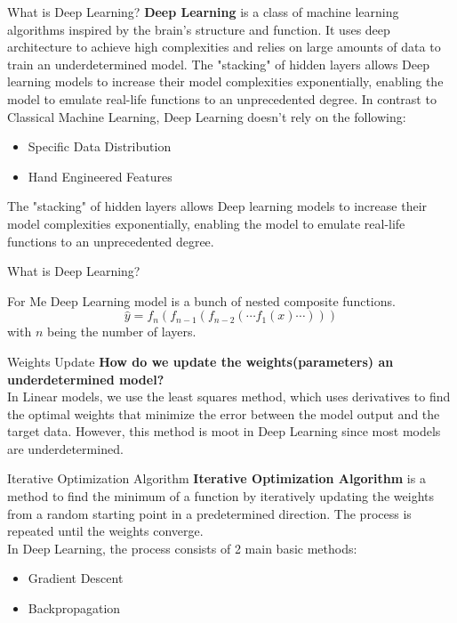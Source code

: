 \documentclass{beamer}
\begin{document}
\begin{frame}[fragile]{What is Deep Learning?}
    \textbf{Deep Learning} is a class of machine learning algorithms inspired by the brain's structure and function. It uses deep architecture to achieve high complexities and relies on large amounts of data to train an underdetermined model. The "stacking" of hidden layers allows Deep learning models to increase their model complexities exponentially, enabling the model to emulate real-life functions to an unprecedented degree. In contrast to Classical Machine Learning, Deep Learning doesn't rely on the following:
    \begin{itemize}
        \item Specific Data Distribution
        \item Hand Engineered Features
    \end{itemize}
    The "stacking" of hidden layers allows Deep learning models to increase their model complexities exponentially, enabling the model to emulate real-life functions to an unprecedented degree.
\end{frame}
\begin{frame}[fragile]{What is Deep Learning?}
    \begin{block}{For Me}
        Deep Learning model is a bunch of nested composite functions.\\
        \begin{equation*}
            \hat{y} = f_{n}(f_{n-1}(f_{n-2}(\cdots f_{1}(x)\cdots)))
        \end{equation*}
        with $n$ being the number of layers.
    \end{block}
\end{frame}
\begin{frame}[fragile]{Weights Update}
    \textbf{How do we update the weights(parameters) an underdetermined model?}\\
    In Linear models, we use the least squares method, which uses derivatives to find the optimal weights that minimize the error between the model output and the target data.
    However, this method is moot in Deep Learning since most models are underdetermined.
\end{frame}
\begin{frame}[fragile]{Iterative Optimization Algorithm}
    \textbf{Iterative Optimization Algorithm} is a method to find the minimum of a function by iteratively updating the weights from a random starting point in a predetermined direction. The process is repeated until the weights converge. \\
    In Deep Learning, the process consists of 2 main basic methods:
    \begin{itemize}
        \item Gradient Descent
        \item Backpropagation
    \end{itemize}
\end{frame}
\end{document}
